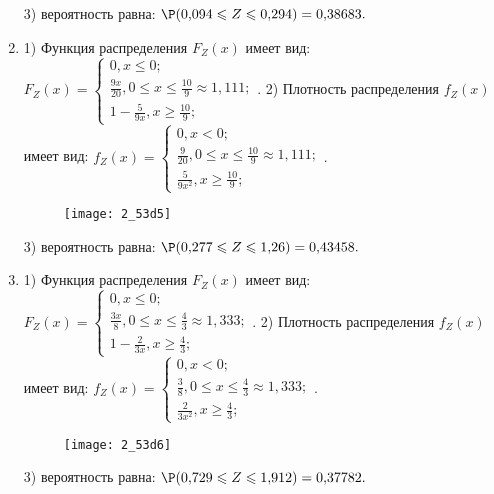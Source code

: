 \documentclass[a4paper,12pt]{article}
\begin{document}
\begin{enumerate}
3) вероятность равна:
$
\P(0,\!094\leqslant Z\leqslant 0,\!294)=
0,\!38683.
$



\item


1) Функция распределения $F_Z(x)$ имеет вид:
$
F_Z(x)=\left\{
\begin{array}{l}
0, x\leqslant 0;\\
\frac{9 x}{20}, 0\leqslant x\leqslant \frac{10}{9}\approx 1,\!111;\\
1 - \frac{5}{9 x}, x\geqslant\frac{10}{9};
\end{array}.
\right.
$
2) Плотность распределения $f_Z(x)$ имеет вид:
$
f_Z(x)=\left\{
\begin{array}{l}
0, x<0;\\
\frac{9}{20}, 0\leqslant x\leqslant \frac{10}{9}\approx 1,\!111;\\
\frac{5}{9 x^{2}}, x\geqslant\frac{10}{9};
\end{array}.
\right.
$


\begin{figure}[H]
    \texttt{[image: 2\_53d5]}
\end{figure}


3) вероятность равна:
$
\P(0,\!277\leqslant Z\leqslant 1,\!26)=
0,\!43458.
$



\item


1) Функция распределения $F_Z(x)$ имеет вид:
$
F_Z(x)=\left\{
\begin{array}{l}
0, x\leqslant 0;\\
\frac{3 x}{8}, 0\leqslant x\leqslant \frac{4}{3}\approx 1,\!333;\\
1 - \frac{2}{3 x}, x\geqslant\frac{4}{3};
\end{array}.
\right.
$
2) Плотность распределения $f_Z(x)$ имеет вид:
$
f_Z(x)=\left\{
\begin{array}{l}
0, x<0;\\
\frac{3}{8}, 0\leqslant x\leqslant \frac{4}{3}\approx 1,\!333;\\
\frac{2}{3 x^{2}}, x\geqslant\frac{4}{3};
\end{array}.
\right.
$


\begin{figure}[H]
    \texttt{[image: 2\_53d6]}
\end{figure}


3) вероятность равна:
$
\P(0,\!729\leqslant Z\leqslant 1,\!912)=
0,\!37782.
$




\end{enumerate}
\end{document}
